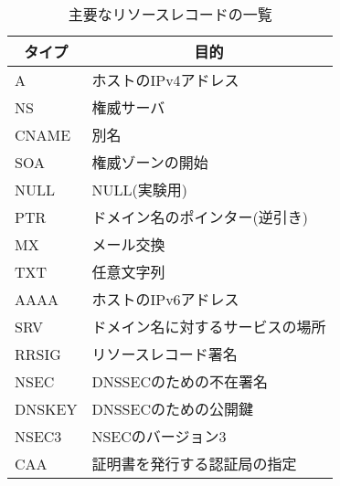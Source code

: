 \begin{table}[h]
 \caption{主要なリソースレコードの一覧}
 \centering
  \begin{tabular}{ll}
    \toprule
		\multicolumn{1}{c}{\textbf{タイプ}} & \multicolumn{1}{c}{\textbf{目的}} \\
    \midrule
    A &  ホストのIPv4アドレス \\
    NS & 権威サーバ \\
    CNAME & 別名 \\
    SOA & 権威ゾーンの開始 \\
    NULL & NULL(実験用) \\
    PTR & ドメイン名のポインター(逆引き) \\
    MX & メール交換 \\
    TXT & 任意文字列 \\
    AAAA & ホストのIPv6アドレス \\
		SRV & ドメイン名に対するサービスの場所\\
    RRSIG & リソースレコード署名\\
    NSEC & DNSSECのための不在署名\\
    DNSKEY & DNSSECのための公開鍵\\
    NSEC3 & NSECのバージョン3\\
    CAA & 証明書を発行する認証局の指定\\
    \bottomrule
  \end{tabular}
 \label{tab:resource-record}
\end{table}
